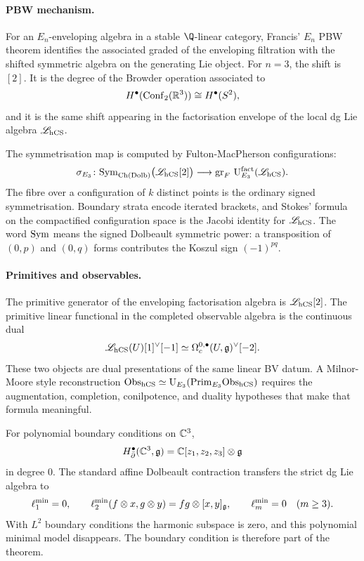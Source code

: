 \paragraph{PBW mechanism.}
For an \(E_n\)-enveloping algebra in a stable \(\Q\)-linear category,
Francis' \(E_n\) PBW theorem identifies the associated graded of the
enveloping filtration with the shifted symmetric algebra on the
generating Lie object. For \(n=3\), the shift is \([2]\). It is the
degree of the Browder operation associated to
\[
  H^\bullet(\mathrm{Conf}_2(\mathbb{R}^3))\cong H^\bullet(S^2),
\]
and it is the same shift appearing in the factorisation envelope of the
local dg Lie algebra \(\mathscr L_{\mathrm{hCS}}\).

The symmetrisation map is computed by Fulton-MacPherson configurations:
\[
  \sigma_{E_3}\colon
  \mathrm{Sym}_{\mathrm{Ch}(\mathrm{Dolb})}\bigl(\mathscr L_{\mathrm{hCS}}[2]\bigr)
  \longrightarrow
  \operatorname{gr}_F\,
  \mathrm U^{\mathrm{fact}}_{E_3}(\mathscr L_{\mathrm{hCS}}).
\]
The fibre over a configuration of \(k\) distinct points is the ordinary
signed symmetrisation. Boundary strata encode iterated brackets, and
Stokes' formula on the compactified configuration space is the Jacobi
identity for \(\mathscr L_{\mathrm{hCS}}\). The word \(\mathrm{Sym}\) means the signed
Dolbeault symmetric power: a transposition of \((0,p)\) and \((0,q)\)
forms contributes the Koszul sign \((-1)^{pq}\).

\paragraph{Primitives and observables.}
The primitive generator of the enveloping factorisation algebra is
\(\mathscr L_{\mathrm{hCS}}[2]\). The primitive linear functional in the
completed observable algebra is the continuous dual
\[
  \mathscr L_{\mathrm{hCS}}(U)[1]^\vee[-1]
  \simeq
  \Omega^{0,\bullet}_c(U,\mathfrak{g})^\vee[-2].
\]
These two objects are dual presentations of the same linear BV datum. A
Milnor-Moore style reconstruction
\(\mathrm{Obs}_{\mathrm{hCS}}\simeq \mathrm{U}_{E_3}(\mathrm{Prim}_{E_3}\mathrm{Obs}_{\mathrm{hCS}})\) requires the
augmentation, completion, conilpotence, and duality hypotheses that make
that formula meaningful.

For polynomial boundary conditions on \(\mathbb{C}^3\),
\[
  H^\bullet_{\bar\partial}(\mathbb{C}^3,\mathfrak{g})=\mathbb{C}[z_1,z_2,z_3]\otimes\mathfrak{g}
\]
in degree \(0\). The standard affine Dolbeault contraction transfers the
strict dg Lie algebra to
\[
  \ell_1^{\min}=0,\qquad
  \ell_2^{\min}(f\otimes x,g\otimes y)=fg\otimes[x,y]_{\mathfrak{g}},\qquad
  \ell_m^{\min}=0\quad(m\geq3).
\]
With \(L^2\) boundary conditions the harmonic subspace is zero, and this
polynomial minimal model disappears. The boundary condition is therefore
part of the theorem.

